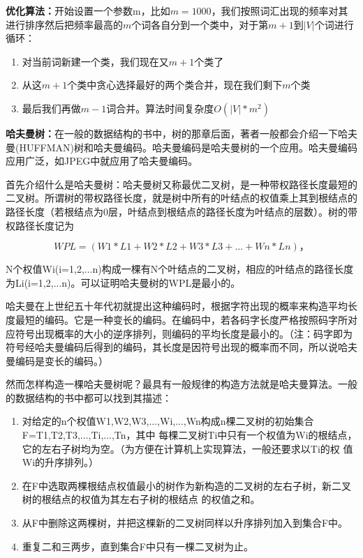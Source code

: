 \documentclass[12pt,a4paper]{article}
\begin{document}
\textbf{优化算法：}开始设置一个参数m，比如$m=1000$，我们按照词汇出现的频率对其进行排序然后把频率最高的$m$个词各自分到一个类中，对于第$m+1$到$|V|$个词进行循环：
\begin{enumerate}
  \item 对当前词新建一个类，我们现在又$m+1$个类了
  \item 从这$m+1$个类中贪心选择最好的两个类合并，现在我们剩下$m$个类
  \item 最后我们再做$m-1$词合并。算法时间复杂度$O(|V|*m^2)$
\end{enumerate}


\textbf{哈夫曼树：}在一般的数据结构的书中，树的那章后面，著者一般都会介绍一下哈夫曼(HUFFMAN)树和哈夫曼编码。哈夫曼编码是哈夫曼树的一个应用。哈夫曼编码应用广泛，如JPEG中就应用了哈夫曼编码。

首先介绍什么是哈夫曼树：哈夫曼树又称最优二叉树，是一种带权路径长度最短的二叉树。所谓树的带权路径长度，就是树中所有的叶结点的权值乘上其到根结点的路径长度（若根结点为0层，叶结点到根结点的路径长度为叶结点的层数）。树的带权路径长度记为

\begin{equation}
WPL=(W1*L1+W2*L2+W3*L3+...+Wn*Ln)，
\end{equation}

N个权值Wi(i=1,2,...n)构成一棵有N个叶结点的二叉树，相应的叶结点的路径长度为Li(i=1,2,...n)。可以证明哈夫曼树的WPL是最小的。

哈夫曼在上世纪五十年代初就提出这种编码时，根据字符出现的概率来构造平均长度最短的编码。它是一种变长的编码。在编码中，若各码字长度严格按照码字所对应符号出现概率的大小的逆序排列，则编码的平均长度是最小的。（注：码字即为符号经哈夫曼编码后得到的编码，其长度是因符号出现的概率而不同，所以说哈夫曼编码是变长的编码。）

然而怎样构造一棵哈夫曼树呢？最具有一般规律的构造方法就是哈夫曼算法。一般的数据结构的书中都可以找到其描述：
\begin{enumerate}
  \item 对给定的n个权值{W1,W2,W3,...,Wi,...,Wn}构成n棵二叉树的初始集合F={T1,T2,T3,...,Ti,...,Tn}，其中
每棵二叉树Ti中只有一个权值为Wi的根结点，它的左右子树均为空。（为方便在计算机上实现算法，一般还要求以Ti的权
值Wi的升序排列。）
\item 在F中选取两棵根结点权值最小的树作为新构造的二叉树的左右子树，新二叉树的根结点的权值为其左右子树的根结点
的权值之和。
\item 从F中删除这两棵树，并把这棵新的二叉树同样以升序排列加入到集合F中。
\item 重复二和三两步，直到集合F中只有一棵二叉树为止。
\end{enumerate}
\end{document}

